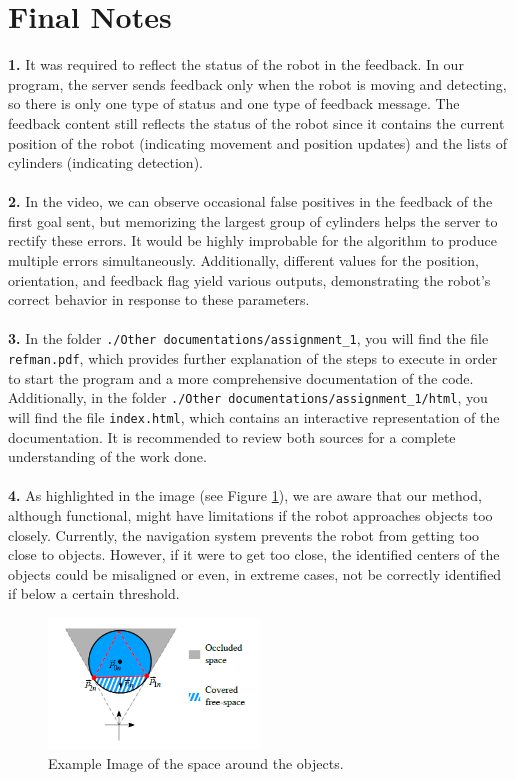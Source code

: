 \section{Final Notes}
\textbf{1.} It was required to reflect the status of the robot in the feedback. In our program, the server sends feedback only when the robot is moving and detecting, so there is only one type of status and one type of feedback message. The feedback content still reflects the status of the robot since it contains the current position of the robot (indicating movement and position updates) and the lists of cylinders (indicating detection).\\\\

\textbf{2.} In the video, we can observe occasional false positives in the feedback of the first goal sent, but memorizing the largest group of cylinders helps the server to rectify these errors. It would be highly improbable for the algorithm to produce multiple errors simultaneously. Additionally, different values for the position, orientation, and feedback flag yield various outputs, demonstrating the robot's correct behavior in response to these parameters.\\\\

\textbf{3.} In the folder \texttt{./Other documentations/assignment\_1}, you will find the file \texttt{refman.pdf}, which provides further explanation of the steps to execute in order to start the program and a more comprehensive documentation of the code.\\ 
Additionally, in the folder \texttt{./Other documentations/assignment\_1/html}, you will find the file \texttt{index.html}, which contains an interactive representation of the documentation. It is recommended to review both sources for a complete understanding of the work done.\\\\

\textbf{4.} As highlighted in the image (see Figure \ref{fig:example}), we are aware that our method, although functional, might have limitations if the robot approaches objects too closely. Currently, the navigation system prevents the robot from getting too close to objects. However, if it were to get too close, the identified centers of the objects could be misaligned or even, in extreme cases, not be correctly identified if below a certain threshold.

\begin{figure}[h]
    \centering
    \includegraphics[width=0.5\textwidth]{./images/detection/circle-extraction.PNG} %
    \caption{Example Image of the space around the objects.}
    \label{fig:example}
\end{figure}

%